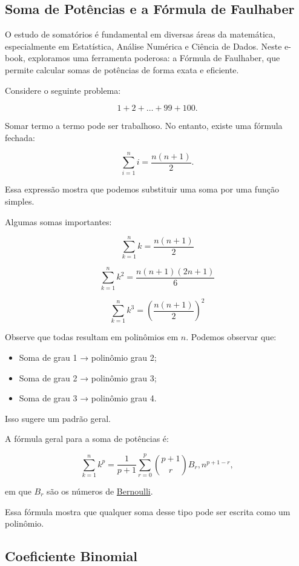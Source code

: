 \documentclass[
  letterpaper,
  DIV=11,
  numbers=noendperiod]{scrreprt}
\providecommand{\tightlist}{%
  \setlength{\itemsep}{0pt}\setlength{\parskip}{0pt}}\usepackage{longtable,booktabs,array}
\begin{document}
\subsection{Soma de Potências e a Fórmula de
Faulhaber}\label{soma-de-potuxeancias-e-a-fuxf3rmula-de-faulhaber}

O estudo de somatórios é fundamental em diversas áreas da matemática,
especialmente em Estatística, Análise Numérica e Ciência de Dados. Neste
e-book, exploramos uma ferramenta poderosa: a Fórmula de Faulhaber, que
permite calcular somas de potências de forma exata e eficiente.

Considere o seguinte problema:

\[1  + 2 + \dots + 99 + 100.\]

Somar termo a termo pode ser trabalhoso. No entanto, existe uma fórmula
fechada:

\[\sum \limits_{i=1}^{n} i = \frac{n(n+1)}{2}.\]

Essa expressão mostra que podemos substituir uma soma por uma função
simples.

Algumas somas importantes:

\[\sum_{k=1}^{n} k = \frac{n(n+1)}{2}\]

\[\sum_{k=1}^{n} k^2 = \frac{n(n+1)(2n+1)}{6}\]

\[\sum_{k=1}^{n} k^3 = \left(\frac{n(n+1)}{2}\right)^2\]

Observe que todas resultam em polinômios em \(n\). Podemos observar que:

\begin{itemize}
\tightlist
\item
  Soma de grau 1 → polinômio grau 2;
\item
  Soma de grau 2 → polinômio grau 3;
\item
  Soma de grau 3 → polinômio grau 4.
\end{itemize}

Isso sugere um padrão geral.

A fórmula geral para a soma de potências é:

\[\sum_{k=1}^{n} k^{p} = \frac{1}{p+1} \sum_{r=0}^{p} \binom{p+1}{r} B_r , n^{p+1-r},\]

em que \(B_r\) são os números de
\href{https://en.wikipedia.org/wiki/Bernoulli_number}{Bernoulli}.

Essa fórmula mostra que qualquer soma desse tipo pode ser escrita como
um polinômio.

\subsection{Coeficiente Binomial}\label{coeficiente-binomial}
\end{document}
